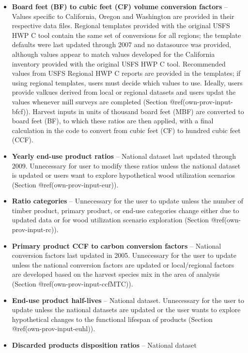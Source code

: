 \documentclass[
  openany]{book}
\begin{document}
\begin{itemize}
\item
  \textbf{Board feet (BF) to cubic feet (CF) volume conversion factors}
  -- Values specific to California, Oregon and Washington are provided
  in their respective data files. Regional templates provided with the
  original USFS HWP C tool contain the same set of conversions for all
  regions; the template defaults were last updated through 2007 and no
  datasource was provided, although values appear to match values
  developed for the California inventory provided with the original USFS
  HWP C tool. Recommended values from USFS Regional HWP C reports are
  provided in the templates; if using regional templates, users must
  decide which values to use. Ideally, users provide valkues derived
  from local or regional datasets and users updat the values whenever
  mill surveys are completed (Section @ref(own-prov-input-bfcf)).
  Harvest inputs in units of thousand board feet (MBF) are converted to
  board feet (BF), to which these ratios are then applied, with a final
  calculation in the code to convert from cubic feet (CF) to hundred
  cubic feet (CCF).
\item
  \textbf{Yearly end-use product ratios} -- National dataset last
  updated through 2009. Unnecessary for user to modify these ratios
  unless the national dataset is updated or users want to explore
  hypothetical wood utilization scenarios (Section
  @ref(own-prov-input-eur)).
\item
  \textbf{Ratio categories} -- Unnecessary for the user to update unless
  the number of timber product, primary product, or end-use categories
  change either due to updated data or for wood utilization scenario
  exploration (Section @ref(own-prov-input-rc)).
\item
  \textbf{Primary product CCF to carbon conversion factors} -- National
  conversion factors last updated in 2005. Unnecessary for the user to
  update unless the national conversion factors are updated or
  local/regional factors are developed based on the harvest species mix
  in the area of analysis (Section @ref(own-prov-input-ccfMTC)).
\item
  \textbf{End-use product half-lives} -- National dataset. Unnecessary
  for the user to update unless the national datasets are updated or the
  user wants to explore hypothetical changes to the functional lifespan
  of products (Section @ref(own-prov-input-euhl)).
\item
  \textbf{Discarded products disposition ratios} -- National dataset

\end{itemize}
\end{document}
